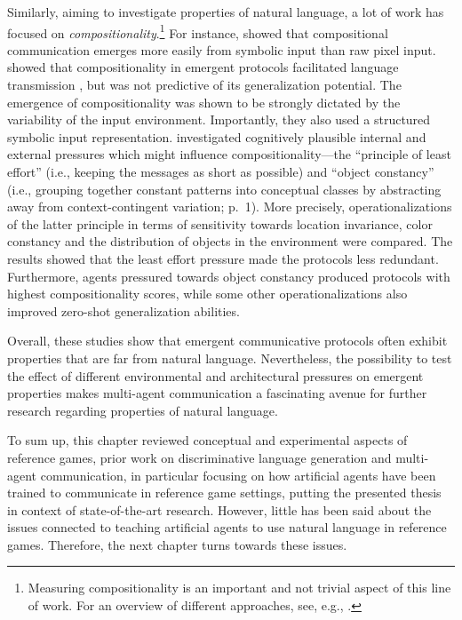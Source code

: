 Similarly, aiming to investigate properties of natural language, a lot of work has focused on \textit{compositionality}.\footnote{Measuring compositionality is an important and not trivial aspect of this line of work. For an overview of different approaches, see, e.g., \cite{lazaridou2020emergent}.} For instance, \cite{lazaridou2018emergence} showed that compositional communication emerges more easily from symbolic input than raw pixel input. 
\cite{chaabouni2020compositionality} showed that compositionality in emergent protocols facilitated language transmission \parencite[cf.][]{kirby2014iterated, lazaridou2020emergent}, but was not predictive of its generalization potential. The emergence of compositionality was shown to be strongly dictated by the variability of the input environment. Importantly, they also used a structured symbolic input representation.
\cite{luna2020internal} investigated cognitively plausible internal and external pressures which might influence compositionality---the ``principle of least effort'' (i.e., keeping the messages as short as possible) and ``object constancy'' (i.e., grouping together constant patterns into conceptual classes by abstracting away from context-contingent variation; p.~1). More precisely, operationalizations of the latter principle in terms of sensitivity towards location invariance, color constancy and the distribution of objects in the environment were compared. The results showed that the least effort pressure made the protocols less redundant. Furthermore, agents pressured towards object constancy produced protocols with highest compositionality scores, while some other operationalizations also improved zero-shot generalization abilities. 

Overall, these studies show that emergent communicative protocols often exhibit properties that are far from natural language. Nevertheless, the possibility to test the effect of different environmental and architectural pressures on emergent properties makes multi-agent communication a fascinating avenue for further research regarding properties of natural language. 


To sum up, this chapter reviewed conceptual and experimental aspects of reference games, prior work on discriminative language generation and multi-agent communication, in particular focusing on how artificial agents have been trained to communicate in reference game settings, putting the presented thesis in context of state-of-the-art research. However, little has been said about the issues connected to teaching artificial agents to use natural language in reference games. Therefore, the next chapter turns towards these issues.